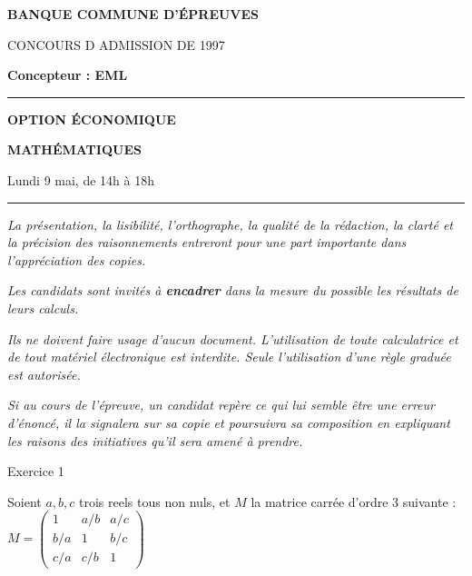 \documentclass[11pt]{article}%
\begin{document}

\begin{center}
{\LARG\E\textbf{BANQUE COMMUNE D'ÉPREUVES}}



{\large \textsc{CONCOURS D ADMISSION DE 1997}}



{\large \textbf{Concepteur : EML}}



\rule{2.39cm}{0.05cm}



{\Large \textbf{OPTION ÉCONOMIQUE}}



{\Large \textbf{MATHÉMATIQUES }}



{\Large Lundi 9 mai, de 14h à 18h}



\rule{2.39cm}{0.05cm}
\end{center}

\textit{La présentation, la lisibilité, l'orthographe, la qualité
de la rédaction, la clarté et la précision des raisonnements
entreront pour une part importante dans l'appréciation des copies.}

\textit{Les candidats sont invités à \textbf{encadrer} dans la mesure
du possible les résultats de leurs calculs.}

\textit{Ils ne doivent faire usage d'aucun document. L'utilisation de
toute
calculatrice et de tout matériel électronique est interdite. Seule
l'utilisation d'une règle graduée est autorisée.}

\textit{Si au cours de l'épreuve, un candidat repère ce qui lui semble
être une erreur d'énoncé, il la signalera sur sa copie et
poursuivra sa composition en expliquant les raisons des initiatives
qu'il sera
amené à prendre.}

\vspace*{3cm}


\begin{center}
{\LARGE Exercice 1}
\end{center}

Soient $a,b,c$ trois reels tous non nuls, et $M$ la matrice carrée
d'ordre 3 suivante : $M = \left( 
\begin{array}{lll}
1 & a/b & a/c \\
b/a & 1 & b/c \\
c/a & c/b & 1
\end{array}
\right) $
\end{document}
